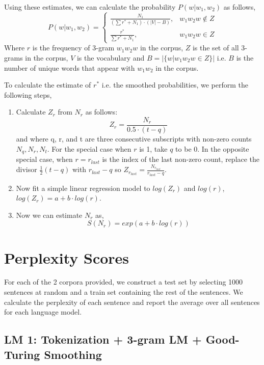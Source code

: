 \documentclass[a4paper,9pt]{report}
\begin{document}
Using these estimates, we can calculate the probability $P(w | w_1, w_2)$ as follows,
\[
    P(w | w_1, w_2) = 
    \begin{cases}
        \frac{N_1}{(\sum r^* + N_1) \cdot (|V| - B)}, & w_1w_2w \notin Z \\
        \frac{r^*}{\sum r^* + N_1}, & w_1w_2w \in Z
    \end{cases}
\]
Where $r$ is the frequency of 3-gram $w_1w_2w$ in the corpus, $Z$ is the set of all 3-grams in the corpus, $V$ is the vocabulary and $B = |\{w | w_1w_2w \in Z\}|$ i.e. $B$ is the number of unique words that appear with $w_1w_2$ in the corpus.

To calculate the estimate of $r^*$ i.e. the smoothed probabilities, we perform the following steps,
\begin{enumerate}
    \item Calculate $Z_r$ from $N_r$ as follows:
    $$
        Z_r = \frac{N_r}{0.5\cdot(t-q)}
    $$
    and where q, r, and t are three consecutive subscripts with non-zero counts $N_q, N_r, N_t$. For the special case when $r$ is 1, take $q$ to be 0. In the opposite special case, when 
$r = r_{last}$ is the index of the last non-zero count, replace the divisor $\frac{1}{2} (t-q)$ with $r_{last} - q$ so $Z_{r_{last}} = \frac{N_{r_{last}}}{r_{last} - q}$.
    \item Now fit a simple linear regression model to $log(Z_r)$ and $log(r)$, $log(Z_r) = a + b \cdot log(r)$.
    \item Now we can estimate $N_r$ as,
        $$
            S(N_r) = exp(a + b \cdot log(r)) 
        $$
\end{enumerate}

\section*{Perplexity Scores}
For each of the 2 corpora provided, we construct a test set by selecting 1000 sentences at random and a train set containing the rest of the sentences. We calculate the perplexity of each sentence and report the average over all sentences for each language model.

\subsection*{LM 1: Tokenization + 3-gram LM + Good-Turing Smoothing}
\end{document}
